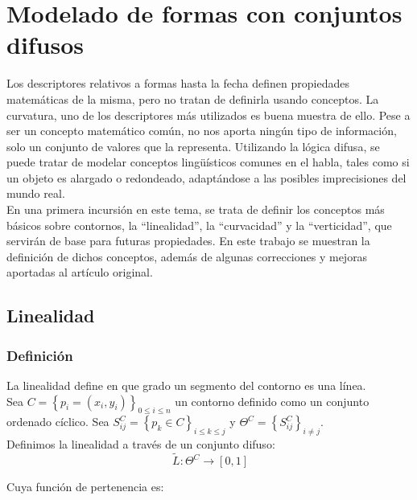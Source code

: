 \section{Modelado de formas con conjuntos difusos}

Los descriptores relativos a formas hasta la fecha definen propiedades matemáticas de la misma, pero no tratan de definirla usando conceptos. La curvatura, uno de los descriptores más utilizados es buena muestra de ello. Pese a ser un concepto matemático común, no nos aporta ningún tipo de información, solo un conjunto de valores que la representa. Utilizando la lógica difusa, se puede tratar de modelar conceptos lingüísticos comunes en el habla, tales como si un objeto es alargado o redondeado, adaptándose a las posibles imprecisiones del mundo real.\\

En una primera incursión en este tema\cite{JChamorro}, se trata de definir los conceptos más básicos sobre contornos, la ``linealidad'', la ``curvacidad'' y la ``verticidad'', que servirán de base para futuras propiedades. En este trabajo se muestran la definición de dichos conceptos, además de algunas correcciones y mejoras aportadas al artículo original.\\

\subsection{Linealidad}

\subsubsection{Definición}
La linealidad define en que grado un segmento del contorno es una línea.\\

Sea $ C = \left\lbrace p_i = \left( x_i,y_i\right) \right\rbrace_{0\leq i\leq n}$ un contorno definido como un conjunto ordenado cíclico. Sea $S^C_{ij} = \left\lbrace p_k \in C \right\rbrace_{i \leq k \leq j}$ y $\Theta^C = \left\lbrace S^C_{ij}\right\rbrace_{i \neq j}$.\\

Definimos la linealidad a través de un conjunto difuso:\\

\[
\ \tilde{L}:\Theta^C \rightarrow \left[ 0,1 \right]
\]

Cuya función de pertenencia es:\\

